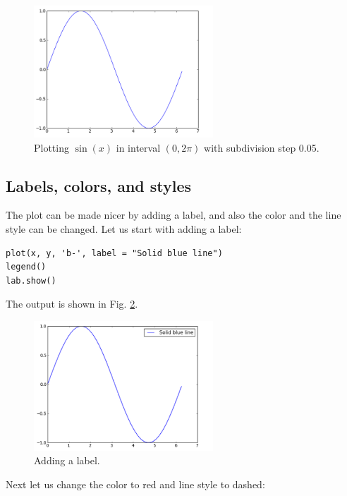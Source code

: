 \begin{figure}[!ht]
\begin{center}
\includegraphics[width=0.6\textwidth]{imgp/plot1.png}
\end{center}
\vspace{-6mm}
\caption{Plotting $\sin(x)$ in interval $(0, 2\pi)$ with subdivision step 0.05.}
\label{fig:plot1}
\vspace{-2mm}
\end{figure}
\noindent

\subsection{Labels, colors, and styles}

The plot can be made nicer by adding a label, and also the color 
and the line style can be changed. Let us start with adding a label:

\begin{verbatim}
plot(x, y, 'b-', label = "Solid blue line")
legend()
lab.show()
\end{verbatim}
The output is shown in Fig. \ref{fig:plot2}.\\[-7mm]

\begin{figure}[!ht]
\begin{center}
\includegraphics[width=0.6\textwidth]{imgp/plot2.png}
\end{center}
\vspace{-6mm}
\caption{Adding a label.}
\label{fig:plot2}
\end{figure}
\newpage
\noindent
Next let us change the color to red and line style to dashed: 

